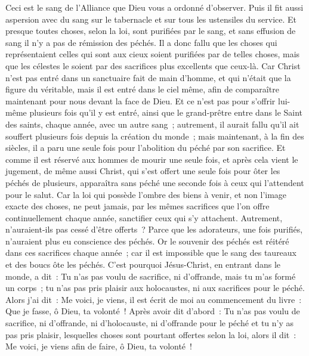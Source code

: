 \begin{multicols}{2}
Ceci est le sang de l'Alliance que Dieu vous a ordonné d'observer.
Puis il fit aussi aspersion avec du sang sur le tabernacle et sur tous les ustensiles du service.
Et presque toutes choses, selon la loi, sont purifiées par le sang, et sans effusion de sang il n'y a pas de rémission des péchés.
Il a donc fallu que les choses qui représentaient celles qui sont aux cieux soient purifiées par de telles choses, mais que les célestes le soient par des sacrifices plus excellents que ceux-là.
Car Christ n'est pas entré dans un sanctuaire fait de main d'homme, et qui n'était que la figure du véritable, mais il est entré dans le ciel même, afin de comparaître maintenant pour nous devant la face de Dieu.
Et ce n'est pas pour s'offrir lui-même plusieurs fois qu'il y est entré, ainsi que le grand-prêtre entre dans le Saint des saints, chaque année, avec un autre sang~;
autrement, il aurait fallu qu'il ait souffert plusieurs fois depuis la création du monde~; mais maintenant, à la fin des siècles, il a paru une seule fois pour l'abolition du péché par son sacrifice.
Et comme il est réservé aux hommes de mourir une seule fois, et après cela vient le jugement,
de même aussi Christ, qui s'est offert une seule fois pour ôter les péchés de plusieurs, apparaîtra sans péché une seconde fois à ceux qui l'attendent pour le salut.
\VerseOne{}Car la loi qui possède l'ombre des biens à venir, et non l'image exacte des choses, ne peut jamais, par les mêmes sacrifices que l'on offre continuellement chaque année, sanctifier ceux qui s'y attachent.
Autrement, n'auraient-ils pas cessé d'être offerts~? Parce que les adorateurs, une fois purifiés, n'auraient plus eu conscience des péchés.
Or le souvenir des péchés est réitéré dans ces sacrifices chaque année~;
car il est impossible que le sang des taureaux et des boucs ôte les péchés.
C'est pourquoi Jésus-Christ, en entrant dans le monde, a dit~: Tu n'as pas voulu de sacrifice, ni d'offrande, mais tu m'as formé un corps~;
tu n'as pas pris plaisir aux holocaustes, ni aux sacrifices pour le péché.
Alors j'ai dit~: Me voici, je viens, il est écrit de moi au commencement du livre~: Que je fasse, ô Dieu, ta volonté~!
Après avoir dit d'abord~: Tu n'as pas voulu de sacrifice, ni d'offrande, ni d'holocauste, ni d'offrande pour le péché et tu n'y as pas pris plaisir, lesquelles choses sont pourtant offertes selon la loi, alors il dit~: Me voici, je viens afin de faire, ô Dieu, ta volonté~!

\end{multicols}
